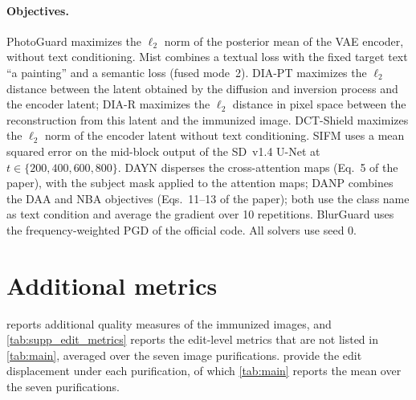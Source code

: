 \paragraph{Objectives.} PhotoGuard maximizes the $\ell_2$ norm of the posterior mean of the VAE encoder, without text conditioning. Mist combines a textual loss with the fixed target text ``a painting'' and a semantic loss (fused mode~2). DIA-PT maximizes the $\ell_2$ distance between the latent obtained by the diffusion and inversion process and the encoder latent; DIA-R maximizes the $\ell_2$ distance in pixel space between the reconstruction from this latent and the immunized image. DCT-Shield maximizes the $\ell_2$ norm of the encoder latent without text conditioning. SIFM uses a mean squared error on the mid-block output of the SD~v1.4 U-Net at $t \in \{200, 400, 600, 800\}$. DAYN disperses the cross-attention maps (Eq.~5 of the paper), with the subject mask applied to the attention maps; DANP combines the DAA and NBA objectives (Eqs.~11--13 of the paper); both use the class name as text condition and average the gradient over 10 repetitions. BlurGuard uses the frequency-weighted PGD of the official code. All solvers use seed 0.

\section{Additional metrics}
\label{sec:supp_metrics}
 reports additional quality measures of the immunized images, and \cref{tab:supp_edit_metrics} reports the edit-level metrics that are not listed in \cref{tab:main}, averaged over the seven image purifications.  provide the edit displacement under each purification, of which \cref{tab:main} reports the mean over the seven purifications.


